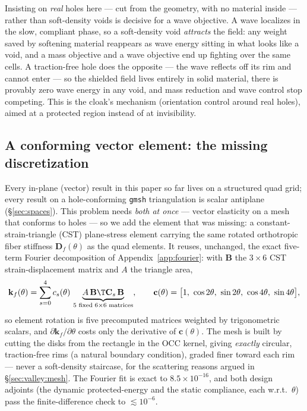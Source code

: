 \documentclass[11pt]{article}
\begin{document}
Insisting on \emph{real} holes here --- cut from the geometry, with no material
inside --- rather than soft-density voids is decisive for a wave objective. A wave
localizes in the slow, compliant phase, so a soft-density void \emph{attracts} the
field: any weight saved by softening material reappears as wave energy sitting in
what looks like a void, and a mass objective and a wave objective end up fighting
over the same cells. A traction-free hole does the opposite --- the wave reflects off
its rim and cannot enter --- so the shielded field lives entirely in solid material,
there is provably zero wave energy in any void, and mass reduction and wave control
stop competing. This is the cloak's mechanism (orientation control around real holes),
aimed at a protected region instead of at invisibility.

\subsection{A conforming vector element: the missing discretization}
\label{sec:codesign:cst}
Every in-plane (vector) result in this paper so far lives on a structured quad grid;
every result on a hole-conforming \texttt{gmsh} triangulation is scalar antiplane
(\S\ref{sec:spaces}). This problem needs \emph{both at once} --- vector elasticity on
a mesh that conforms to holes --- so we add the element that was missing: a
constant-strain-triangle (CST) plane-stress element carrying the same rotated
orthotropic fiber stiffness $\mathbf D_f(\theta)$ as the quad elements. It reuses,
unchanged, the exact five-term Fourier decomposition of Appendix~\ref{app:fourier}:
with $\mathbf B$ the $3\times6$ CST strain-displacement matrix and $A$ the triangle
area,
\begin{equation}
  \mathbf k_f(\theta)=\sum_{s=0}^{4} c_s(\theta)\,\underbrace{A\,\mathbf B\T
    \mathbf C_s\,\mathbf B}_{\text{5 fixed }6\times6\text{ matrices}},\qquad
  \mathbf c(\theta)=\bigl[1,\ \cos2\theta,\ \sin2\theta,\ \cos4\theta,\ \sin4\theta\bigr],
  \label{eq:cstfourier}
\end{equation}
so element rotation is five precomputed matrices weighted by trigonometric scalars,
and $\partial\mathbf k_f/\partial\theta$ costs only the derivative of
$\mathbf c(\theta)$. The mesh is built by cutting the disks from the rectangle in the
OCC kernel, giving \emph{exactly} circular, traction-free rims (a natural boundary
condition), graded finer toward each rim --- never a soft-density staircase, for the
scattering reasons argued in \S\ref{sec:valley:mesh}. The Fourier fit is exact to
$8.5\times10^{-16}$, and both design adjoints (the dynamic protected-energy and the
static compliance, each w.r.t.\ $\theta$) pass the finite-difference check to
$\lesssim10^{-6}$.
\end{document}
